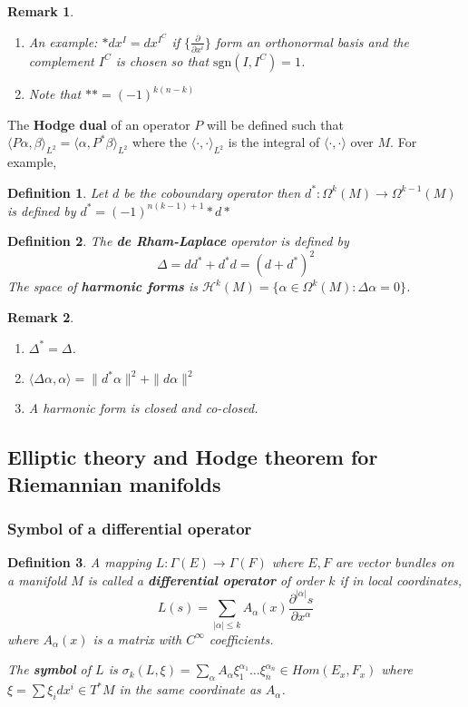 \documentclass[11pt]{article}
\newtheorem{remark}{Remark}
\newtheorem{definition}{Definition}
\begin{document}
\begin{remark}
\begin{enumerate}
\item An example: \(*dx^I = dx^{I^C}\) if \(\{\frac{\partial}{\partial x^i}\}\) form an orthonormal
basis and the complement \(I^C\) is chosen so that \(\text{sgn}(I, I^C) = 1\).
\item Note that \(** = (-1)^{k(n-k)}\)
\end{enumerate}
\end{remark}


The \textbf{Hodge dual} of an operator \(P\) will be defined such that \(\langle P \alpha,
\beta \rangle_{L^2} = \langle \alpha, P^* \beta \rangle_{L^2}\) where the \(\langle
\cdot,\cdot\rangle_{L^2}\) is the integral of \(\langle \cdot,\cdot \rangle\) over \(M\). For example,

\begin{definition}
Let \(d\) be the coboundary operator then \(d^* : \Omega^{k}(M) \longrightarrow
\Omega^{k-1}(M)\) is defined by \(d^* = (-1)^{n(k-1)+1}*d*\)
\end{definition}

\begin{definition}
The \textbf{de Rham-Laplace} operator is defined by
\[
\Delta = dd^* + d^* d = (d+d^*)^2
\]
The space of \textbf{harmonic forms} is \(\mathcal{H}^k(M) = \{ \alpha  \in \Omega^k(M) : \Delta
\alpha = 0 \}\).
\end{definition}

\begin{remark}
\begin{enumerate}
\item \(\Delta^* = \Delta\).
\item \(\langle \Delta\alpha, \alpha \rangle  = \|d^*\alpha \|^2 + \|d\alpha\|^2\)
\item A harmonic form is closed and co-closed.
\end{enumerate}
\end{remark}


\subsection{Elliptic theory and Hodge theorem for Riemannian manifolds}
\label{sec:org32ac1ee}
\subsubsection{Symbol of a differential operator}
\label{sec:orgdad7a0c}
\begin{definition}
A mapping \(L: \Gamma(E) \longrightarrow \Gamma(F)\) where \(E,F\) are vector bundles
on a manifold \(M\) is called a \textbf{differential operator} of order \(k\) if in local coordinates,
\[
L(s) = \sum_{|\alpha|\leq k} A_\alpha(x) \frac{\partial^|\alpha| s}{\partial x^\alpha}
\]
where \(A_\alpha(x)\) is a matrix with \(C^\infty\) coefficients.

The \textbf{symbol} of \(L\) is \(\sigma_k(L,\xi) = \sum_\alpha A_{\alpha} \xi_1^{\alpha_1} \dots
\xi_n^{\alpha_n} \in Hom(E_x,F_x)\) where \(\xi = \sum \xi_i dx^i\in T^*M\) in the same coordinate as \(A_\alpha\). 
\end{definition}
\end{document}
